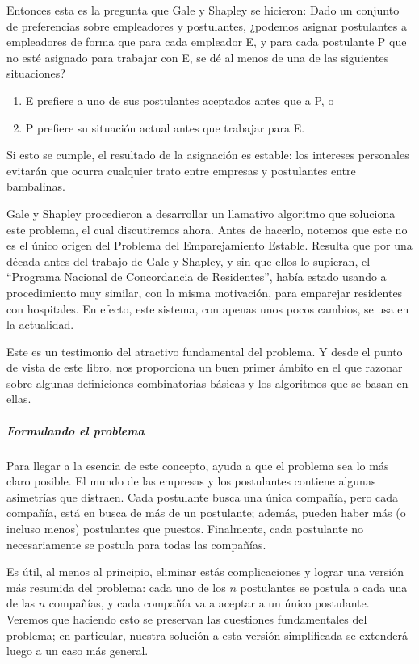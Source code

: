 \documentclass[a4paper, 12pt]{book}
\theoremstyle{dotless}
\begin{document}
Entonces esta es la pregunta que Gale y Shapley se hicieron: Dado un conjunto de preferencias sobre empleadores y postulantes, ¿podemos asignar postulantes a empleadores de forma que para cada empleador E, y para cada postulante P que no esté asignado para trabajar con E, se dé al menos de una de las siguientes situaciones?

    \begin{enumerate}
       \item E prefiere a uno de sus postulantes aceptados antes que a P, o
       \item P prefiere su situación actual antes que trabajar para E.
    \end{enumerate}

Si esto se cumple, el resultado de la asignación es estable: los intereses personales evitarán que ocurra cualquier trato entre empresas y postulantes entre bambalinas.
	
Gale y Shapley procedieron a desarrollar un llamativo algoritmo que soluciona este problema, el cual discutiremos ahora. Antes de hacerlo, notemos que este no es el único origen del Problema del Emparejamiento Estable. Resulta que por una década antes del trabajo de Gale y Shapley, y sin que ellos lo supieran, el ``Programa Nacional de Concordancia de Residentes'', había estado usando a procedimiento muy similar, con la misma motivación, para emparejar residentes con hospitales. En efecto, este sistema, con apenas unos pocos cambios, se usa en la actualidad.

Este es un testimonio del atractivo fundamental del problema. Y desde el punto de vista de este libro, nos proporciona un buen primer ámbito en el que razonar sobre algunas definiciones combinatorias básicas y los algoritmos que se basan en ellas.

\subparagraph{Formulando el problema} Para llegar a la esencia de este concepto, ayuda a que el problema sea lo más claro posible. El mundo de las empresas y los postulantes contiene algunas asimetrías que distraen. Cada postulante busca una única compañía, pero cada compañía, está en busca de más de un postulante; además, pueden haber más (o incluso menos) postulantes que puestos. Finalmente, cada postulante no necesariamente se postula para todas las compañías.

Es útil, al menos al principio, eliminar estás complicaciones y lograr una versión más resumida del problema: cada uno de los $n$ postulantes se postula a cada una de las $n$ compañías, y cada compañía va a aceptar a un único postulante. Veremos que haciendo esto se preservan las cuestiones fundamentales del problema; en particular, nuestra solución a esta versión simplificada se extenderá luego a un caso más general.
\end{document}
